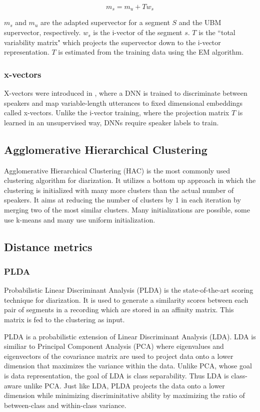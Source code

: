 		$$ m_s = m_u + Tw_s $$
		
		$m_s$ and $m_u$ are the adapted supervector for a segment $S$ and the UBM supervector, respectively. $w_s$ is the i-vector of the segment $s$. $T$ is the ``total variability matrix" which projects the supervector down to the i-vector representation. $T$ is estimated from the training data using the EM algorithm.
		
		\subsubsection{x-vectors}
		X-vectors were introduced in \cite{snyder2018x}, where a DNN is trained to discriminate between speakers and map variable-length utterances to fixed dimensional embeddings called x-vectors. Unlike the i-vector training, where the projection matrix $T$ is learned in an unsupervised way, DNNs require speaker labels to train.
				
	\subsection{Agglomerative Hierarchical Clustering}
		Agglomerative Hierarchical Clustering (HAC) is the most commonly used clustering algorithm for diarization. It utilizes a bottom up approach in which the clustering is initialized with many more clusters than the actual number of speakers. It aims at reducing the number of clusters by 1 in each iteration by merging two of the most similar clusters. Many initializations are possible, some use k-means and many use uniform initialization.

	\subsection{Distance metrics}
		\subsubsection{PLDA}
		Probabilistic Linear Discriminant Analysis (PLDA) is the state-of-the-art scoring technique for diarization. It is used to generate a similarity scores between each pair of segments in a recording which are stored in an affinity matrix. This matrix is fed to the clustering as input.
		
		PLDA is a probabilistic extension of Linear Discriminant Analysis (LDA). LDA is similiar to Principal Component Analysis (PCA) where eigenvalues and eigenvectors of the covariance matrix are used to project data onto a lower dimension that maximizes the variance within the data. Unlike PCA, whose goal is data representation, the goal of LDA is class separability. Thus LDA is class-aware unlike PCA. Just like LDA, PLDA projects the data onto a lower dimension while minimizing discriminitative ability by maximizing the ratio of between-class and within-class variance.
		
